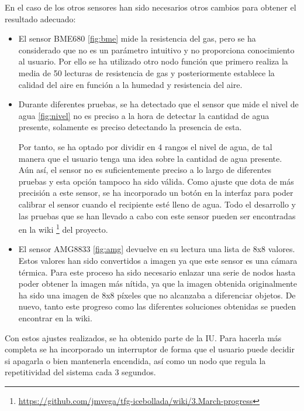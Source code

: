 En el caso de los otros sensores han sido necesarios otros cambios para obtener el resultado adecuado:
\begin{itemize}
	\item El sensor BME680 \ref{fig:bme} mide la resistencia del gas, pero se ha considerado que no es un parámetro intuitivo y no proporciona conocimiento al usuario. Por ello se ha utilizado otro nodo función que primero realiza la media de 50 lecturas de resistencia de gas y posteriormente establece la calidad del aire en función a la humedad y resistencia del aire.
	\item Durante diferentes pruebas, se ha detectado que el sensor que mide el nivel de agua \ref{fig:nivel} no es preciso a la hora de detectar la cantidad de agua presente, solamente es preciso detectando la presencia de esta.
	
	Por tanto, se ha optado por dividir en 4 rangos el nivel de agua, de tal manera que el usuario tenga una idea sobre la cantidad de agua presente. Aún así, el sensor no es suficientemente preciso a lo largo de diferentes pruebas y esta opción tampoco ha sido válida. 
	Como ajuste que dota de más precisión a este sensor, se ha incorporado un botón en la interfaz para poder calibrar el sensor cuando el recipiente esté lleno de agua. Todo el desarrollo y las pruebas que se han llevado a cabo con este sensor pueden ser encontradas en la wiki \footnote{\url{https://github.com/jmvega/tfg-icebollada/wiki/3.March-progress}} del proyecto.
	
	\item El sensor AMG8833 \ref{fig:amg} devuelve en su lectura una lista de 8x8 valores. Estos valores han sido convertidos a imagen ya que este sensor es una cámara térmica. Para este proceso ha sido necesario enlazar una serie de nodos hasta poder obtener la imagen más nítida, ya que la imagen obtenida originalmente ha sido una imagen de 8x8 píxeles que no alcanzaba a diferenciar objetos. De nuevo, tanto este progreso como las diferentes soluciones obtenidas se pueden encontrar en la wiki. 
\end{itemize}

Con estos ajustes realizados, se ha obtenido parte de la IU. Para hacerla más completa se ha incorporado un interruptor de forma que el usuario puede decidir si apagarla o bien mantenerla encendida, así como un nodo que regula la repetitividad del sistema cada 3 segundos.

